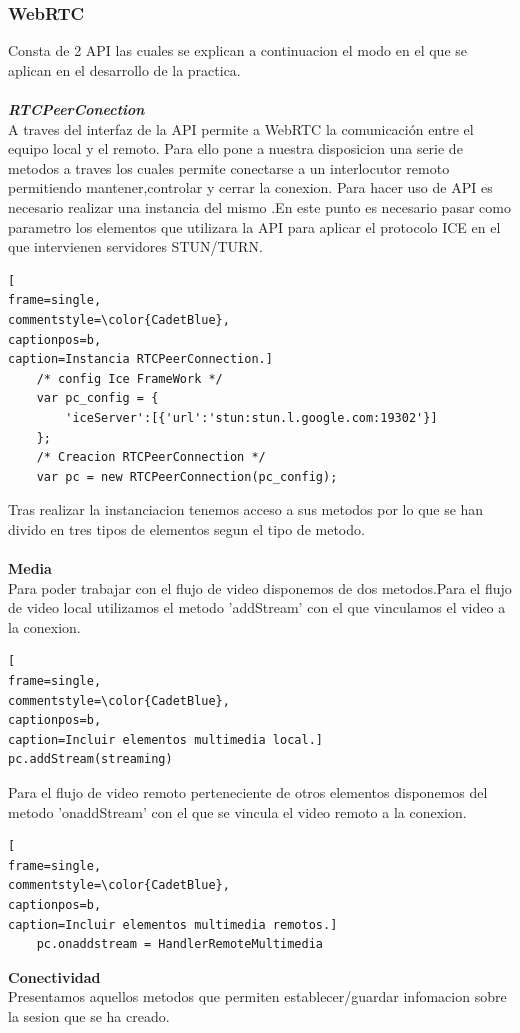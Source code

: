 \subsubsection{WebRTC}
Consta de 2 API las cuales se explican a continuacion el modo en el que se aplican en el desarrollo de la practica.
\\
\\\textbf{\textit{RTCPeerConection}}
\\A traves del interfaz de la API  permite a WebRTC la comunicación entre el equipo local y el remoto.
Para ello pone a nuestra disposicion una serie de metodos a traves los cuales permite conectarse a un interlocutor remoto permitiendo mantener,controlar y cerrar la conexion.
Para hacer uso de API es necesario realizar una instancia del mismo .En este punto es necesario pasar como parametro los elementos que utilizara la API para aplicar el protocolo ICE en el que intervienen servidores STUN/TURN. 
\begin{lstlisting}[
frame=single,
commentstyle=\color{CadetBlue},
captionpos=b,
caption=Instancia RTCPeerConnection.]
    /* config Ice FrameWork */
    var pc_config = {
        'iceServer':[{'url':'stun:stun.l.google.com:19302'}]
    };
    /* Creacion RTCPeerConnection */
    var pc = new RTCPeerConnection(pc_config);
\end{lstlisting}
Tras realizar la instanciacion tenemos acceso a sus metodos por lo que se han divido en tres tipos de elementos segun el tipo de metodo.
\\
\\\textbf{Media}
\\Para poder trabajar con el flujo de video disponemos de dos metodos.Para el flujo de video local utilizamos el metodo 'addStream'  con el que vinculamos el video a la conexion.
\begin{lstlisting}[
frame=single,
commentstyle=\color{CadetBlue},
captionpos=b,
caption=Incluir elementos multimedia local.]
pc.addStream(streaming)
\end{lstlisting}
Para el flujo de video remoto perteneciente de otros elementos disponemos del metodo 'onaddStream' con el que se vincula el video remoto a la conexion.
\begin{lstlisting}[
frame=single,
commentstyle=\color{CadetBlue},
captionpos=b,
caption=Incluir elementos multimedia remotos.]
    pc.onaddstream = HandlerRemoteMultimedia
\end{lstlisting}
\textbf{Conectividad} 
\\Presentamos aquellos metodos que permiten establecer/guardar infomacion sobre la sesion que se ha creado.
